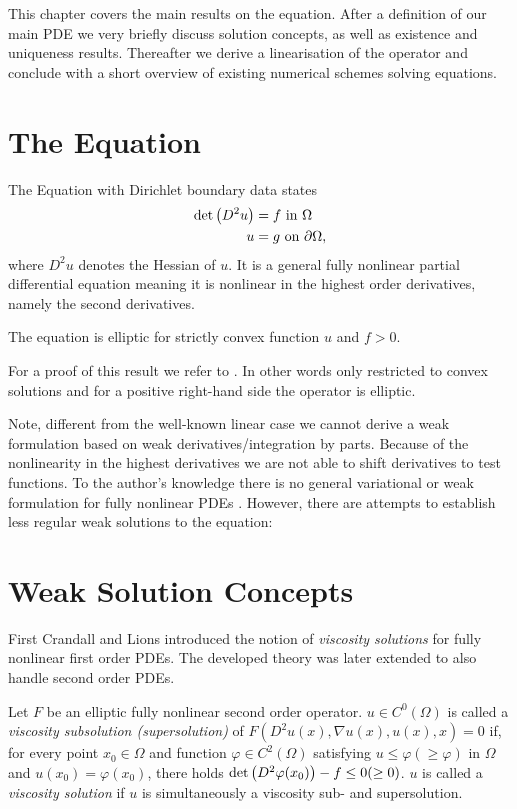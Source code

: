 This chapter covers the main results on the \MA equation. After a definition of our main PDE we very briefly discuss solution concepts, as well as existence and uniqueness results. Thereafter we derive a linearisation of the \MA operator and conclude with a short overview of existing numerical schemes solving \MA equations. 


\section{The \MA Equation}

The \MA Equation with Dirichlet boundary data states
\begin{align}
	 \det{\left(D^2 u\right)} &= f \textnormal{ in } \Omega \label{MA eq}\\
	 u & = g \textnormal{ on } \partial \Omega,
\end{align}
where $D^2 u$ denotes the Hessian of $u$.
It is a general fully nonlinear partial differential equation meaning it is nonlinear in the highest order derivatives, namely the second derivatives.

\begin{proposition}
	The \MA equation is elliptic for strictly convex function $u$ and $f > 0$.
\end{proposition}
For a proof of this result we refer to \cite{CC1995, GT1977}. In other words only restricted to convex solutions and for a positive right-hand side the \MA operator is elliptic.

Note, different from the well-known linear case we cannot derive a weak formulation based on weak derivatives/integration by parts. Because of the nonlinearity in the highest derivatives we are not able to shift derivatives to test functions. To the author's knowledge there is no general variational or weak formulation for fully nonlinear PDEs \cite{FGN2013}.
However, there are attempts to establish less regular weak solutions to the \MA equation:

\section{Weak Solution Concepts}
First Crandall and Lions \cite{CL1983} introduced the notion of \emph{viscosity solutions} for fully nonlinear first order PDEs. The developed theory was later extended to also handle second order PDEs.
\begin{definition}
	Let $F$ be an elliptic  fully nonlinear second order operator.
	$u \in C^0(\Omega)$ is called a \emph{viscosity subsolution (supersolution)} of $F(D^2u(x), \nabla u(x), u(x), x)=0$  if, for every point $x_0 \in \Omega$ and function $\varphi \in C^2(\Omega)$ satisfying $u \leq \varphi (\geq \varphi)$ in $\Omega$ and $u(x_0) = \varphi(x_0)$, there holds $\det{\left(D^2 \varphi(x_0)\right)} - f \leq 0 (\geq 0)$. 
	$u$ is called a \emph{viscosity solution} if $u$ is simultaneously a viscosity sub- and supersolution.
\end{definition}

